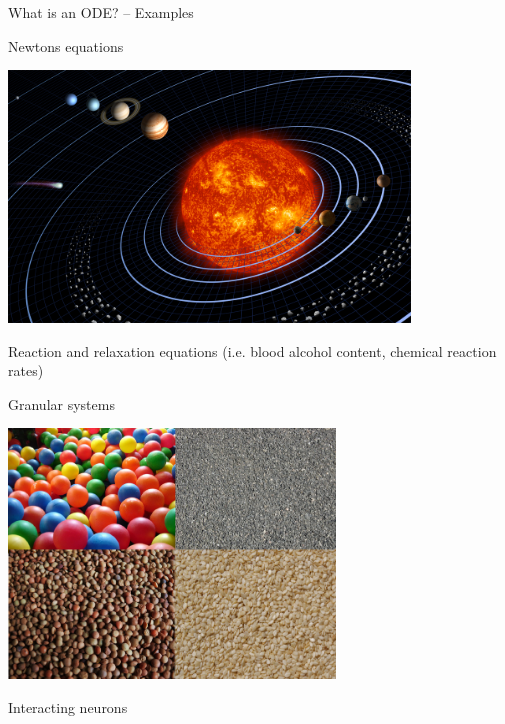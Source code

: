 \documentclass{beamer}
\newcommand{\heading}[1]{\centerline{\Large #1} \vspace{0.5em}}
\begin{document}
\begin{frame}
 
\heading{What is an ODE? -- Examples}

\vspace{2ex}

\begin{minipage}{0.48\textwidth}
 \begin{center}
  Newtons equations

  \includegraphics[draft=false,width=0.8\textwidth]{solar_system.jpg}
 \end{center}
\end{minipage}
\begin{minipage}{0.48\textwidth}
 \begin{center}
  Reaction and relaxation equations (i.e. blood alcohol content, chemical reaction rates)
 \end{center}
\end{minipage}
\vspace{2ex}

\begin{minipage}{0.48\textwidth}
 \begin{center}
  Granular systems

  \includegraphics[draft=false,width=0.65\textwidth]{granular_system.png}
 \end{center}
\end{minipage}
\begin{minipage}{0.48\textwidth}
 \begin{center}
  Interacting neurons


\end{center}
\end{minipage}
\end{frame}
\end{document}
